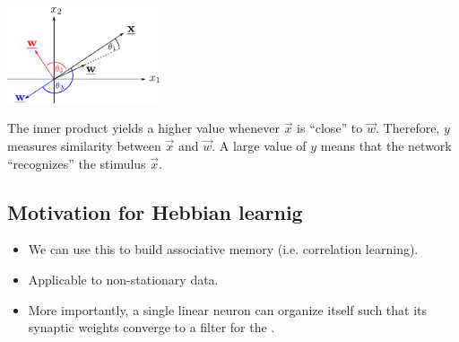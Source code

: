 \begin{frame}{\secname}
\begin{itemize}
{\begin{center}
\includegraphics[width=4.5cm]{img/wxangle}
\end{center}

The inner product yields a higher value whenever $\vec x$ is ``close'' to $\vec w$.
Therefore, $y$ measures similarity between $\vec x$ and $\vec w$.
A large value of $y$ means that the network ``recognizes'' the stimulus $\vec x$.
}
\end{itemize}

\end{frame}

\newpage

\subsection{Motivation for Hebbian learnig}

\begin{frame}{\subsecname}

\begin{itemize}
\item We can use this to build associative memory (i.e. correlation learning).
\item Applicable to non-stationary data.
\item More importantly, a single linear neuron 
can organize itself such that its synaptic weights converge to a filter 
for the  \citep{oja1982simplified}.

\pause


\end{itemize}

\end{frame}

